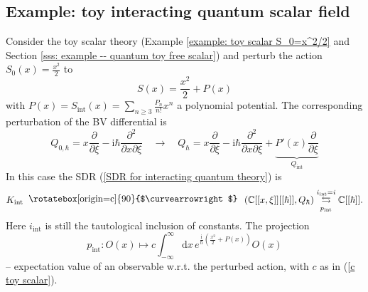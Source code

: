 \documentclass{amsart}
\theoremstyle{plain} %
\theoremstyle{definition}
\newtheorem{expl}[thm]{Example}
\theoremstyle{remark}
\newcommand{\ra}{\rightarrow}
\newcommand{\CC}{\mathbb{C}}
\newcommand{\dd}{\partial}
\newcommand{\ii}{\mathrm{int}}
\newcommand{\iii}{\mathrm{i}}
\newcommand{\SDR}[5]{#5\;\;\raisebox{1.3pt}{\rotatebox[origin=c]{90}{$\curvearrowright$}}\;\; #1 \underset{#4}{\stackrel{#3}{\leftrightarrows}} #2}  %
\newcommand{\dr}{\mathrm{d}}
\begin{document}
\subsection{Example: toy interacting quantum scalar field}
\label{sss example: toy interacting quantum scalar}
    Consider the toy scalar theory (Example \ref{example: toy scalar S_0=x^2/2} and Section \ref{sss: example -- quantum toy free scalar}) and perturb the action $S_0(x)=\frac{x^2}{2}$ 
    to
    \begin{equation}
    S(x)=\frac{x^2}{2}+P(x)
    \end{equation} 
    with $P(x)=S_\ii(x)=\sum_{n\geq 3} \frac{P_n}{n!}x^n$ a polynomial potential. The corresponding perturbation of the BV differential is 
    \begin{equation}
    Q_{0,\hbar}= x\frac{\dd}{\dd \xi}-\iii\hbar \frac{\dd^2}{\dd x\dd \xi} \quad \ra\quad 
    Q_\hbar= x\frac{\dd}{\dd \xi}-\iii\hbar \frac{\dd^2}{\dd x\dd \xi}+\underbrace{P'(x)\frac{\dd}{\dd \xi}}_{Q_\ii}
    \end{equation}
    In this case the SDR (\ref{SDR for interacting quantum theory}) is
    \begin{equation}\label{SDR interacting toy scalar}
        \SDR{\left(\CC[[x,\xi]][[\hbar]], Q_\hbar\right)}{\CC[[\hbar]]}{i_\ii=i}{p_\ii}{K_\ii}.
    \end{equation}
    Here $i_\ii$ is still the tautological inclusion of constants.
    The projection
    \begin{equation}
        p_\ii\colon O(x) \mapsto c \int_{-\infty}^\infty \dr x\, e^{\frac{\iii}{\hbar}(\frac{x^2}{2}+P(x))} O(x)
    \end{equation}
    -- expectation value of an observable w.r.t. the perturbed action, with $c$ as in (\ref{c toy scalar}).
\end{document}

